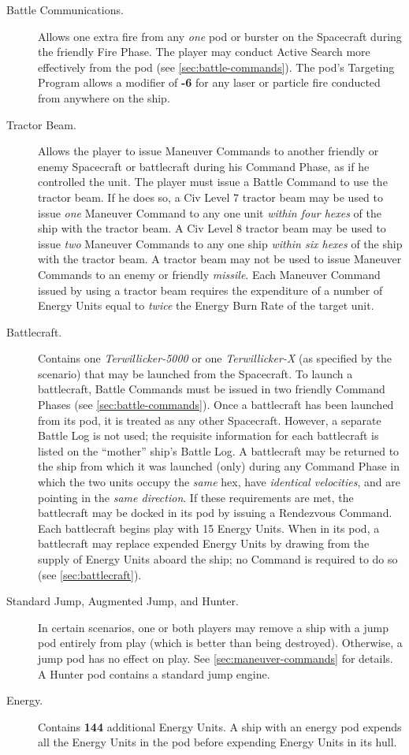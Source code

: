 \begin{description}
\item[Battle Communications.] Allows one extra fire from any
\emph{one} pod or burster on the Spacecraft during the friendly Fire
Phase. The player may conduct Active Search more effectively from the
pod (see \ref{sec:battle-commands}). The pod's Targeting Program allows a
modifier of \textbf{-6} for any laser or particle fire conducted from
anywhere on the ship.

\item[Tractor Beam.] Allows the player to issue Maneuver Commands to
another friendly or enemy Spacecraft or battlecraft during his Command
Phase, as if he controlled the unit. The player must issue a Battle
Command to use the tractor beam. If he does so, a Civ Level 7 tractor
beam may be used to issue \emph{one} Maneuver Command to any one unit
\emph{within four hexes} of the ship with the tractor beam. A Civ
Level 8 tractor beam may be used to issue \emph{two} Maneuver Commands
to any one ship \emph{within six hexes} of the ship with the tractor
beam. A tractor beam may not be used to issue Maneuver Commands to an
enemy or friendly \emph{missile}. Each Maneuver Command issued by
using a tractor beam requires the expenditure of a number of Energy
Units equal to \emph{twice} the Energy Burn Rate of the target unit.

\item[Battlecraft.] Contains one \emph{Terwillicker-5000} or one
\emph{Terwillicker-X} (as specified by the scenario) that may be
launched from the Spacecraft. To launch a battlecraft, Battle Commands
must be issued in two friendly Command Phases (see \ref{sec:battle-commands}).
Once a battlecraft has been launched from its pod, it is treated as
any other Spacecraft. However, a separate Battle Log is not used; the
requisite information for each battlecraft is listed on the ``mother''
ship's Battle Log. A battlecraft may be returned to the ship from
which it was launched (only) during any Command Phase in which the two
units occupy the \emph{same} hex, have \emph{identical velocities},
and are pointing in the \emph{same direction}. If these requirements
are met, the battlecraft may be docked in its pod by issuing a
Rendezvous Command. Each battlecraft begins play with 15 Energy Units.
When in its pod, a battlecraft may replace expended Energy Units by
drawing from the supply of Energy Units aboard the ship; no Command is
required to do so (see \ref{sec:battlecraft}).

\item[Standard Jump, Augmented Jump, and Hunter.] In certain
scenarios, one or both players may remove a ship with a jump pod
entirely from play (which is better than being destroyed). Otherwise,
a jump pod has no effect on play. See \ref{sec:maneuver-commands} for
details. A Hunter pod contains a standard jump engine.

\item[Energy.] Contains \textbf{144} additional Energy Units. A ship
with an energy pod expends all the Energy Units in the pod before
expending Energy Units in its hull.
\end{description}

